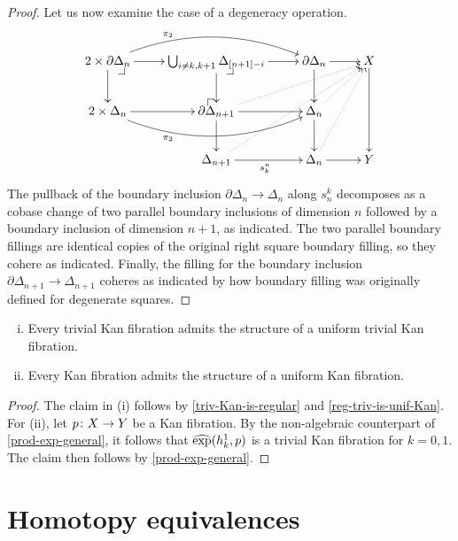 \documentclass[reqno,10pt,a4paper,oneside]{amsart}
\begin{document}
\begin{proof}
Let us now examine the case of a degeneracy operation.
\[
\xymatrix{
  2 \times \partial \Delta_n
  \ar[r]
  \ar[d]
  \ar@/^2em/[rr]^(0.3){\pi_2}
  \pullback{dr}
&
  \bigcup_{i \neq k, k+1} \Delta_{[n+1] - i}
  \ar[r]
  \ar[d]
  \pullback{dr}
&
  \partial \Delta_n
  \ar[d]
  \ar[r]
&
  X
  \ar[dd]
\\
  2 \times \Delta_n
  \ar[r]
  \ar@/_2em/[rr]_(0.3){\pi_2}
&
  \partial \Delta_{n+1}
  \ar[r]
  \ar[d]
  \ar@{.>}[urr]
  \pullback{ul}
&
  \Delta_n
  \ar[d]
  \ar@{.>}[ur]
\\&
  \Delta_{n+1}
  \ar[r]_{s_k^n}
  \ar@{.>}[uurr]
&
  \Delta_n
  \ar[r]
  \ar@{.>}[uur]
&
  Y
}
\]
The pullback of the boundary inclusion $\partial \Delta_n \to \Delta_n$ along $s^k_n$ decomposes as a cobase change of two parallel boundary inclusions of dimension $n$ followed by a boundary inclusion of dimension $n+1$,
as indicated.
The two parallel boundary fillings are identical copies of the original right square boundary filling, so they cohere as indicated.
Finally, the filling for the boundary inclusion~$\partial \Delta_{n+1} \to \Delta_{n+1}$ coheres as indicated by how boundary filling was originally defined for degenerate squares.
\end{proof}











\begin{theorem}[ZFC]  \hfill 
\begin{enumerate}[(i)]
\item  Every trivial Kan fibration admits the structure of a uniform trivial Kan fibration.
\item Every Kan fibration admits the structure of a uniform  Kan fibration.
\end{enumerate} 
\end{theorem}

\begin{proof} The claim in (i) follows by \cref{triv-Kan-is-regular}  and \cref{reg-triv-is-unif-Kan}. For (ii), let
$p \colon X \to Y$ be a Kan fibration. By the non-algebraic counterpart of \cref{prod-exp-general}, it follows 
that $\operatorname{\widehat{exp}}(h_k^1, p)$ is a trivial Kan fibration for $k = 0, 1$. The claim then follows  by \cref{prod-exp-general}. 
\end{proof}




\section{Homotopy equivalences} 
\end{document}
